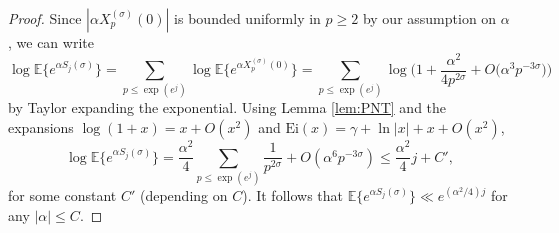 \documentclass{amsart}
\theoremstyle{definition}
\theoremstyle{remark}
\numberwithin{equation}{section}
\begin{document}
\begin{proof}
Since $|\alpha X_p^{(\sigma)}(0)|$ is bounded uniformly in $p\geq 2$ by our assumption on $\alpha$,  we can write
\[
    \log \mathbb{E}\big\{e^{\alpha S_j(\sigma)}\big\}=\sum_{p\leq \exp(e^j)} \log \mathbb{E}\big\{e^{\alpha X_p^{(\sigma)}(0)}\big\}=\sum_{p\leq \exp(e^j)} \log \Big(1+\frac{\alpha^2}{4p^{2\sigma}}+O\big(\alpha^3 p^{-3\sigma}\big)\Big)
\]
by Taylor expanding the exponential. Using Lemma \ref{lem:PNT} and the expansions $\log(1+x)=x+O(x^2)$ and $\mathrm{Ei}(x)=\gamma+\ln|x|+x+O(x^2)$,  
\begin{equation}\label{eq:MGFinc}
     \log \mathbb{E}\big\{e^{\alpha S_j(\sigma)}\big\}=\frac{\alpha^2}{4}\sum_{p\leq \exp(e^j)}\frac{1}{p^{2\sigma}}+O(\alpha^6p^{-3\sigma})\leq \frac{\alpha^2}{4}j+C',
\end{equation}
for some constant $C'$ (depending on $C$). It follows that $\mathbb{E}\{e^{\alpha S_j(\sigma)}\}\ll e^{(\alpha^2/4)j}$ for any $|\alpha|\leq C$. 


\end{proof}
\end{document}
